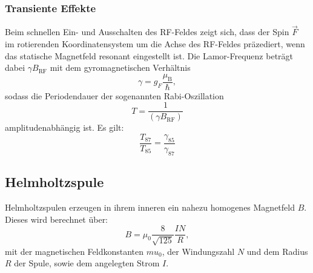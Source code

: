 \newpage
\subsubsection{Transiente Effekte}
\label{subsec:transient}

Beim schnellen Ein- und Ausschalten des RF-Feldes zeigt sich, dass der Spin $\vec{F}$ im rotierenden Koordinatensystem um die Achse des RF-Feldes präzediert, wenn das statische Magnetfeld resonant eingestellt ist. Die Lamor-Frequenz beträgt dabei $\gamma B_{\text{RF}}$ mit dem gyromagnetischen Verhältnis 
\[
\gamma = g_F \frac{\mu_{\text{B}}}{\hbar},
\]
sodass die Periodendauer der sogenannten Rabi-Oszillation 
\[
T=\frac{1}{(\gamma B_\text{RF})}
\]
amplitudenabhängig ist.
Es gilt:
\begin{equation}
\frac{T_{87}}{T_{85}} = \frac{\gamma_{85}}{\gamma_{87}}
\label{eqn:transient}
\end{equation}

\subsection{Helmholtzspule}

Helmholtzspulen erzeugen in ihrem inneren ein nahezu homogenes Magnetfeld $B$. Dieses wird berechnet über:
\begin{equation}
B = \mu_0\frac{8}{\sqrt{125}}\frac{IN}{R},
\label{eq:helmholtz}
\end{equation}
mit der magnetischen Feldkonstanten $mu_0$, der Windungszahl $N$ und dem Radius $R$ der Spule, sowie dem angelegten Strom $I$.